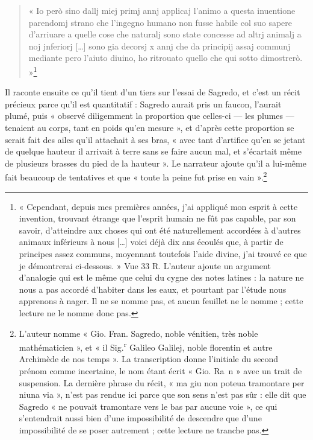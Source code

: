 \documentclass[11pt,a4paper]{article}
\begin{document}
\begin{quote}
« Io però sino dallj miej primj annj applicaj l'animo a questa inuentione
parendomj strano che l'ingegno humano non fusse habile col suo sapere d'arriuare
a quelle cose che naturalj sono state concesse ad altrj animalj a noj jnferiorj
[…] sono gia decorsj x annj che da principij assaj communj mediante pero l'aiuto
diuino, ho ritrouato quello che qui sotto dimostrerò. »\footnote{« Cependant,
depuis mes premières années, j'ai appliqué mon esprit à cette invention,
trouvant étrange que l'esprit humain ne fût pas capable, par son savoir,
d'atteindre aux choses qui ont été naturellement accordées à d'autres animaux
inférieurs à nous […] voici déjà dix ans écoulés que, à partir de principes
assez communs, moyennant toutefois l'aide divine, j'ai trouvé ce que je
démontrerai ci-dessous. » Vue 33 R. L'auteur ajoute un argument
d'analogie qui est le même que celui du cygne des notes latines : la nature ne
nous a pas accordé d'habiter dans les eaux, et pourtant par l'étude nous
apprenons à nager. Il ne se nomme pas, et aucun feuillet ne le nomme ; cette
lecture ne le nomme donc pas.}
\end{quote}

Il raconte ensuite ce qu'il tient d'un tiers sur l'essai de Sagredo, et c'est un
récit précieux parce qu'il est quantitatif : Sagredo aurait pris un faucon,
l'aurait plumé, puis « observé diligemment la proportion que celles-ci — les
plumes — tenaient au corps, tant en poids qu'en mesure », et d'après cette
proportion se serait fait des ailes qu'il attachait à ses bras, « avec tant
d'artifice qu'en se jetant de quelque hauteur il arrivait à terre sans se faire
aucun mal, et s'écartait même de plusieurs brasses du pied de la hauteur ». Le
narrateur ajoute qu'il a lui-même fait beaucoup de tentatives et que « toute la
peine fut prise en vain ».\footnote{L'auteur nomme « Gio. Fran. Sagredo, noble
vénitien, très noble mathématicien », et « il Sig.\textsuperscript{r} Galileo
Galilej, noble florentin et autre Archimède de nos temps ». La transcription donne
l'initiale du second prénom comme incertaine, le nom étant écrit « Gio. Ra~n »
avec un trait de suspension. La dernière phrase du récit, « ma giu non poteua
tramontare per niuna via », n'est pas rendue ici parce que son sens n'est pas
sûr : elle dit que Sagredo « ne pouvait tramontare vers le bas par aucune
voie », ce qui s'entendrait aussi bien d'une impossibilité de descendre que
d'une impossibilité de se poser autrement ; cette lecture ne tranche pas.}
\end{document}
